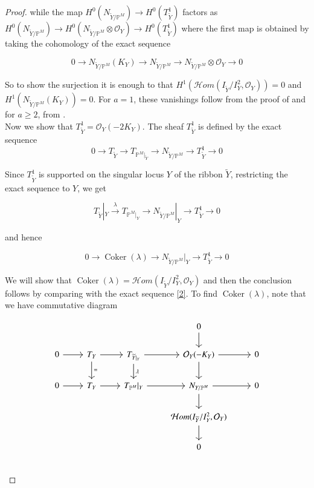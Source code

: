 \documentclass[11pt,twoside]{amsart}
\theoremstyle{plain}
\numberwithin{equation}{section}
\theoremstyle{definition}
\begin{document}
\begin{proof}
while the map $H^0(N_{\widetilde{Y}/\mathbb{P}^M}) \to H^0(T_{\widetilde{Y}}^1)$ factors as $H^0(N_{\widetilde{Y}/\mathbb{P}^M}) \to H^0(N_{\widetilde{Y}/\mathbb{P}^M} \otimes \mathcal{O}_Y) \to H^0(T_{\widetilde{Y}}^1)$ where the first map is obtained by taking the cohomology of the exact sequence

\begin{equation*}
 0 \to N_{\widetilde{Y}/\mathbb{P}^M} (K_Y) \to N_{\widetilde{Y}/\mathbb{P}^M} \to N_{\widetilde{Y}/\mathbb{P}^M} \otimes \mathcal{O}_Y \to 0   
\end{equation*}

So to show the surjection it is enough to that $H^1(\mathcal{H}om(I_{\widetilde{Y}}/I_{Y}^2, \mathcal{O}_Y)) = 0$ and $H^1(N_{\widetilde{Y}/\mathbb{P}^M} (K_Y)) = 0$. For $a = 1$, these vanishings follow from the proof of \cite[Theorem $4.1$]{GP97} and for $a \geq 2$, from \cite[Theorem $5.1$]{BMR21}. \\
\color{black}
Now we show that $T_{\widetilde{Y}}^1 = \mathcal{O}_Y(-2K_Y)$. The sheaf $T_{\widetilde{Y}}^1$ is defined by the exact sequence
$$0 \to T_{\widetilde{Y}} \to T_{\mathbb{P}^M|_{\widetilde{Y}}} \to N_{\widetilde{Y}/\mathbb{P}^M} \to T_{\widetilde{Y}}^1 \to 0$$

Since $T_{\widetilde{Y}}^1$ is supported on the singular locus $Y$ of the ribbon $\widetilde{Y}$, restricting the exact sequence to $Y$, we get 

$$T_{\widetilde{Y}}|_Y \xrightarrow{\lambda} T_{\mathbb{P}^M|_{Y}} \to N_{\widetilde{Y}/\mathbb{P}^M}|_Y \to T_{\widetilde{Y}}^1 \to 0$$

and hence 

$$0 \to \operatorname{Coker}(\lambda) \to N_{\widetilde{Y}/\mathbb{P}^M}|_Y \to T_{\widetilde{Y}}^1 \to 0$$

We will show that $\operatorname{Coker}(\lambda) = \mathcal{H}om(I_{\widetilde{Y}}/I_{Y}^2, \mathcal{O}_Y)$ and then the conclusion follows by comparing with the exact sequence \ref{2}. To find $\operatorname{Coker}(\lambda)$, note that we have commutative diagram 

\[
\begin{tikzcd}
&&& 0 \arrow[d] & \\
0 \arrow[r] & T_Y \arrow[r] \arrow[d, "="] & T_{\widetilde{Y}|_Y} \arrow[d, "\lambda"] \arrow[r] & \mathcal{O}_Y(-K_Y) \arrow[r] \arrow[d] & 0 \\
0 \arrow[r] & T_Y \arrow[r]  & T_{\mathbb{P}^M}|_Y \arrow[r] & N_{Y/\mathbb{P}^M} \arrow[r] \arrow[d] & 0 \\ 
&&& \mathcal{H}om(I_{\widetilde{Y}}/I_{Y}^2, \mathcal{O}_Y) \arrow[d] & \\
&&& 0 & \\
\end{tikzcd}
\]


\end{proof}
\end{document}
